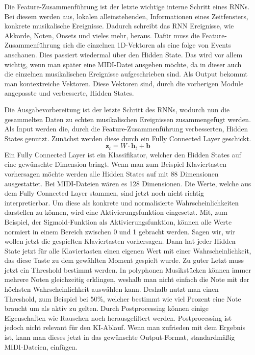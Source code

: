 Die Feature-Zusammenführung ist der letzte wichtige interne Schritt eines RNNs.
Bei diesem werden aus, lokalen alleinstehenden, Informationen eines Zeitfensters, konkrete musikalische Ereignisse.
Dadurch schreibt das RNN Ereignisse, wie Akkorde, Noten, Onsets und vieles mehr, heraus.
Dafür muss die Feature-Zusammenführung sich die einzelnen 1D-Vektoren als eine folge von Events anschauen.
Dies passiert wiedermal über den Hidden State.
Das wird vor allem wichtig, wenn man später eine MIDI-Datei ausgeben möchte,
da in dieser auch die einzelnen musikalischen Ereignisse aufgeschrieben sind.
Als Output bekommt man kontextreiche Vektoren.
Diese Vektoren sind, durch die vorherigen Module angepasste und verbesserte, Hidden States.

Die Ausgabevorbereitung ist der letzte Schritt des RNNs,
wodurch nun die gesammelten Daten zu echten musikalischen Ereignissen zusammengefügt werden.
Als Input werden die, durch die Feature-Zusammenführung verbesserten, Hidden States genutzt.
Zunächst werden diese durch ein Fully Connected Layer geschickt.
\[
\mathbf{z}_t = W \cdot \mathbf{h}_t + \mathbf{b}
\]
Ein Fully Connected Layer ist ein Klassifikator, welcher den Hidden States auf eine gewünschte Dimension bringt.
Wenn man zum Beispiel Klaviertasten vorhersagen möchte werden alle Hidden States auf mit 88 Dimensionen ausgestattet.
Bei MIDI-Dateien wären es 128 Dimensionen.
Die Werte, welche aus dem Fully Connected Layer stammen, sind jetzt noch nicht richtig interpretierbar.
Um diese als konkrete und normalisierte Wahrscheinlichkeiten darstellen zu können,
wird eine Aktivierungsfunktion eingesetzt.
Mit, zum Beispiel, der Sigmoid-Funktion als Aktivierungsfunktion,
können alle Werte normiert in einem Bereich zwischen 0 und 1 gebracht werden.
Sagen wir, wir wollen jetzt die gespielten Klaviertasten vorhersagen.
Dann hat jeder Hidden State jetzt für alle Klaviertasten einen eigenen Wert mit einer Wahrscheinlichkeit,
das diese Taste zu dem gewählten Moment gespielt wurde.
Zu guter Letzt muss jetzt ein Threshold bestimmt werden.
In polyphonen Musikstücken können immer mehrere Noten gleichzeitig erklingen,
weshalb man nicht einfach die Note mit der höchsten Wahrscheinlichkeit auswählen kann.
Deshalb nutzt man einen Threshold, zum Beispiel bei 50\%,
welcher bestimmt wie viel Prozent eine Note braucht um als aktiv zu gelten.
Durch Postprocessing können einige Eigenschaften wie Rauschen noch herausgefiltert werden.
Postprocessing ist jedoch nicht relevant für den KI-Ablauf.
Wenn man zufrieden mit dem Ergebnis ist, kann man dieses jetzt in das gewünschte Output-Format,
standardmäßig MIDI-Dateien, einfügen.


